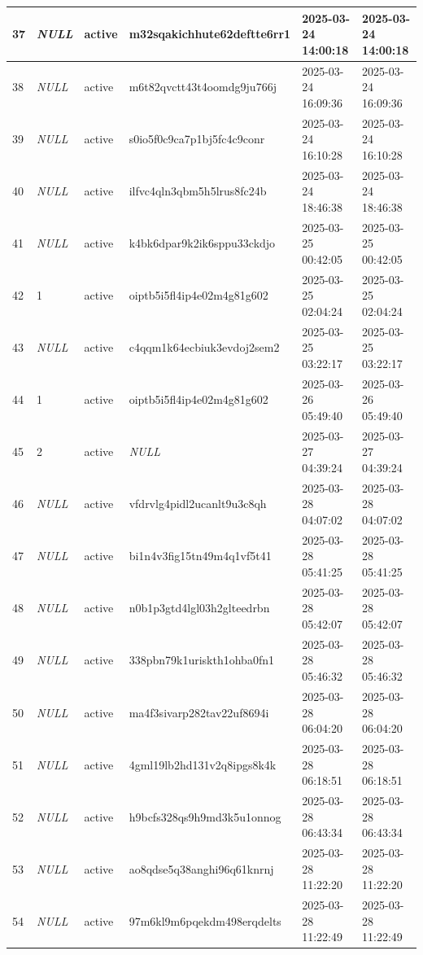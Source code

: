 \begin{longtable}{|l|l|l|l|l|l|}
37 & \textit{NULL} & active & m32sqakichhute62deftte6rr1 & 2025-03-24 14:00:18 & 2025-03-24 14:00:18 \\ \hline 
38 & \textit{NULL} & active & m6t82qvctt43t4oomdg9ju766j & 2025-03-24 16:09:36 & 2025-03-24 16:09:36 \\ \hline 
39 & \textit{NULL} & active & s0io5f0c9ca7p1bj5fc4c9conr & 2025-03-24 16:10:28 & 2025-03-24 16:10:28 \\ \hline 
40 & \textit{NULL} & active & ilfvc4qln3qbm5h5lrus8fc24b & 2025-03-24 18:46:38 & 2025-03-24 18:46:38 \\ \hline 
41 & \textit{NULL} & active & k4bk6dpar9k2ik6sppu33ckdjo & 2025-03-25 00:42:05 & 2025-03-25 00:42:05 \\ \hline 
42 & 1 & active & oiptb5i5fl4ip4e02m4g81g602 & 2025-03-25 02:04:24 & 2025-03-25 02:04:24 \\ \hline 
43 & \textit{NULL} & active & c4qqm1k64ecbiuk3evdoj2sem2 & 2025-03-25 03:22:17 & 2025-03-25 03:22:17 \\ \hline 
44 & 1 & active & oiptb5i5fl4ip4e02m4g81g602 & 2025-03-26 05:49:40 & 2025-03-26 05:49:40 \\ \hline 
45 & 2 & active & \textit{NULL} & 2025-03-27 04:39:24 & 2025-03-27 04:39:24 \\ \hline 
46 & \textit{NULL} & active & vfdrvlg4pidl2ucanlt9u3c8qh & 2025-03-28 04:07:02 & 2025-03-28 04:07:02 \\ \hline 
47 & \textit{NULL} & active & bi1n4v3fig15tn49m4q1vf5t41 & 2025-03-28 05:41:25 & 2025-03-28 05:41:25 \\ \hline 
48 & \textit{NULL} & active & n0b1p3gtd4lgl03h2glteedrbn & 2025-03-28 05:42:07 & 2025-03-28 05:42:07 \\ \hline 
49 & \textit{NULL} & active & 338pbn79k1uriskth1ohba0fn1 & 2025-03-28 05:46:32 & 2025-03-28 05:46:32 \\ \hline 
50 & \textit{NULL} & active & ma4f3sivarp282tav22uf8694i & 2025-03-28 06:04:20 & 2025-03-28 06:04:20 \\ \hline 
51 & \textit{NULL} & active & 4gml19lb2hd131v2q8ipgs8k4k & 2025-03-28 06:18:51 & 2025-03-28 06:18:51 \\ \hline 
52 & \textit{NULL} & active & h9bcfs328qs9h9md3k5u1onnog & 2025-03-28 06:43:34 & 2025-03-28 06:43:34 \\ \hline 
53 & \textit{NULL} & active & ao8qdse5q38anghi96q61knrnj & 2025-03-28 11:22:20 & 2025-03-28 11:22:20 \\ \hline 
54 & \textit{NULL} & active & 97m6kl9m6pqekdm498erqdelts & 2025-03-28 11:22:49 & 2025-03-28 11:22:49 \\ \hline 

\end{longtable}
